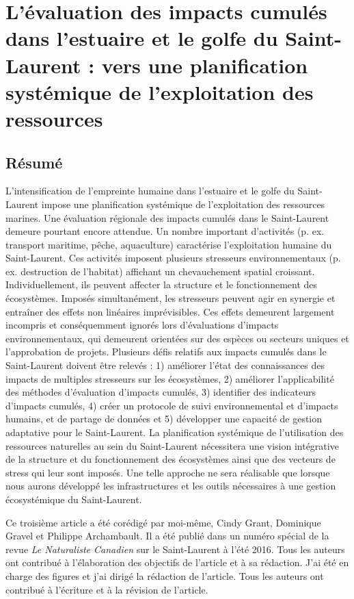 \chapter{L'évaluation des impacts cumulés dans l'estuaire et le golfe du Saint-Laurent : vers une planification systémique de l'exploitation des ressources}
\label{chap3}

\section{Résumé}

L'intensification de l'empreinte humaine dans l'estuaire et le golfe du Saint-Laurent impose une planification systémique de l'exploitation des ressources marines. Une évaluation régionale des impacts cumulés dans le Saint-Laurent demeure pourtant encore attendue. Un nombre important d'activités (p. ex. transport maritime, pêche, aquaculture) caractérise l'exploitation humaine du Saint-Laurent. Ces activités imposent plusieurs stresseurs environnementaux (p. ex. destruction de l'habitat) affichant un chevauchement spatial croissant. Individuellement, ils peuvent affecter la structure et le fonctionnement des écosystèmes. Imposés simultanément, les stresseurs peuvent agir en synergie et entraîner des effets non linéaires imprévisibles. Ces effets demeurent largement incompris et conséquemment ignorés lors d'évaluations d'impacts environnementaux, qui demeurent orientées sur des espèces ou secteurs uniques et l'approbation de projets. Plusieurs défis relatifs aux impacts cumulés dans le Saint-Laurent doivent être relevés : 1) améliorer l'état des connaissances des impacts de multiples stresseurs sur les écosystèmes, 2) améliorer l'applicabilité des méthodes d'évaluation d'impacts cumulés, 3) identifier des indicateurs d'impacts cumulés, 4) créer un protocole de suivi environnemental et d'impacts humains, et de partage de données et 5) développer une capacité de gestion adaptative pour le Saint-Laurent. La planification systémique de l'utilisation des ressources naturelles au sein du Saint-Laurent nécessitera une vision intégrative de la structure et du fonctionnement des écosystèmes ainsi que des vecteurs de stress qui leur sont imposés. Une telle approche ne sera réalisable que lorsque nous aurons développé les infrastructures et les outils nécessaires à une gestion écosystémique du Saint-Laurent.

Ce troisième article a été corédigé par moi-même, Cindy Grant, Dominique Gravel et Philippe Archambault. Il a été publié dans un numéro spécial de la revue \textit{Le Naturaliste Canadien} sur le Saint-Laurent à l'été 2016. Tous les auteurs ont contribué à l'élaboration des objectifs de l'article et à sa rédaction. J'ai été en charge des figures et j'ai dirigé la rédaction de l'article. Tous les auteurs ont contribué à l'écriture et à la révision de l'article. \linebreak[4]

